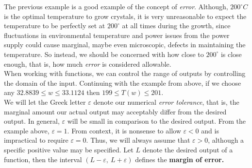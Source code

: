 \documentclass{book}
\begin{document}
The previous example is a good example of the concept of \emph{error}. Although, $200^\circ C$ is the optimal temperature to grow crystals, it is very unreasonable to expect the temperature to be perfectly set at $200^\circ$ at all times during the growth, since fluctuations in environmental temperature and power issues from the power supply could cause marginal, maybe even microscopic, defects in maintaining the temperature. So instead, we should be concerned with how close to $200^\circ$ is close enough, that is, how much \emph{error} is considered allowable.\footnotemark\\

When working with functions, we can control the range of outputs by controlling the domain of the input. Continuing with the example from above, if we choose any $32.8839 \le w \le  33.1124$ then $199 \le T(w) \le  201$. \\

We will let the Greek letter $\varepsilon$ denote our numerical \emph{error tolerance}, that is, the marginal amount our actual output may acceptably differ from the desired output. In general, $\varepsilon$ will be small in comparison to the desired output. From the example above, $\varepsilon = 1$. From context, it is nonsense to allow $\varepsilon < 0$ and is impractical to require $\varepsilon = 0$. Thus, we will always assume that $\varepsilon > 0$, although a specific positive value may be specified. Let $L$ denote the desired output of a function, then the interval $(L-\varepsilon,\ L+\varepsilon)$ defines the \textbf{margin of error.} 
\end{document}
